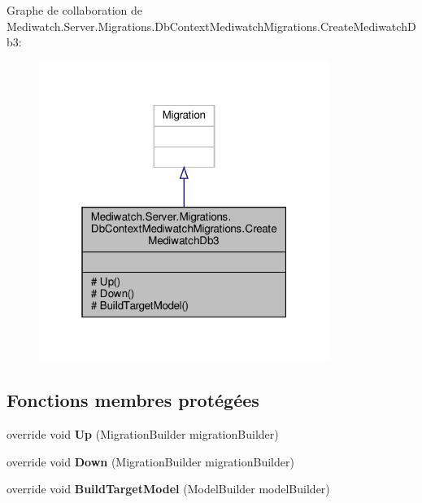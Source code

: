 Graphe de collaboration de Mediwatch.\+Server.\+Migrations.\+Db\+Context\+Mediwatch\+Migrations.\+Create\+Mediwatch\+Db3\+:\nopagebreak
\begin{figure}[H]
\begin{center}
\leavevmode
\includegraphics[width=268pt]{class_mediwatch_1_1_server_1_1_migrations_1_1_db_context_mediwatch_migrations_1_1_create_mediwatch_db3__coll__graph}
\end{center}
\end{figure}
\subsection*{Fonctions membres protégées}
\begin{DoxyCompactItemize}
\item 
\mbox{\label{class_mediwatch_1_1_server_1_1_migrations_1_1_db_context_mediwatch_migrations_1_1_create_mediwatch_db3_a8c9495dcc2accbe3f6b37e1acdd19122}} 
override void {\bfseries Up} (Migration\+Builder migration\+Builder)
\item 
\mbox{\label{class_mediwatch_1_1_server_1_1_migrations_1_1_db_context_mediwatch_migrations_1_1_create_mediwatch_db3_a4a72c103f72d65836ed881119a60f6d8}} 
override void {\bfseries Down} (Migration\+Builder migration\+Builder)
\item 
\mbox{\label{class_mediwatch_1_1_server_1_1_migrations_1_1_db_context_mediwatch_migrations_1_1_create_mediwatch_db3_aeaaed884da705fca8e2f82fee7a32192}} 
override void {\bfseries Build\+Target\+Model} (Model\+Builder model\+Builder)
\end{DoxyCompactItemize}



